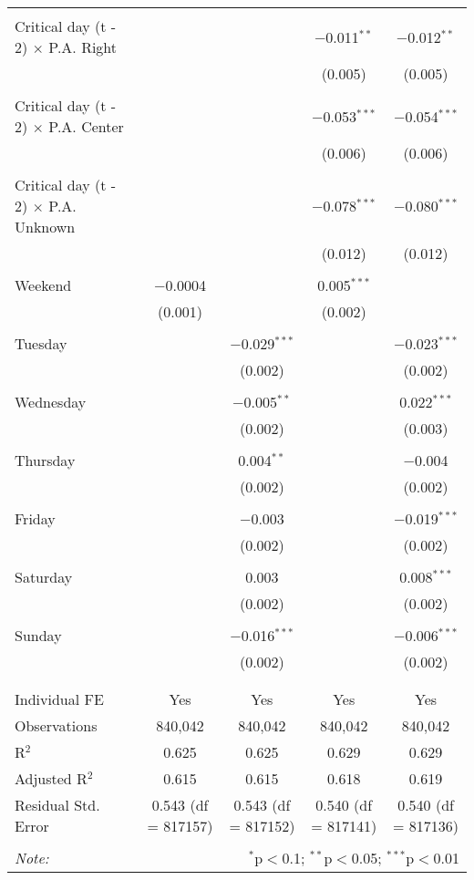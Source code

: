 \documentclass[
]{article}
\begin{document}
\begin{table}[!htbp]
{\begin{tabular}{@{\extracolsep{5pt}}lcccc}
  & & & & \\ 
 Critical day (t - 2) $\times$ P.A. Right &  &  & $-$0.011$^{**}$ & $-$0.012$^{**}$ \\ 
  &  &  & (0.005) & (0.005) \\ 
  & & & & \\ 
 Critical day (t - 2) $\times$ P.A. Center &  &  & $-$0.053$^{***}$ & $-$0.054$^{***}$ \\ 
  &  &  & (0.006) & (0.006) \\ 
  & & & & \\ 
 Critical day (t - 2) $\times$ P.A. Unknown &  &  & $-$0.078$^{***}$ & $-$0.080$^{***}$ \\ 
  &  &  & (0.012) & (0.012) \\ 
  & & & & \\ 
 Weekend & $-$0.0004 &  & 0.005$^{***}$ &  \\ 
  & (0.001) &  & (0.002) &  \\ 
  & & & & \\ 
 Tuesday &  & $-$0.029$^{***}$ &  & $-$0.023$^{***}$ \\ 
  &  & (0.002) &  & (0.002) \\ 
  & & & & \\ 
 Wednesday &  & $-$0.005$^{**}$ &  & 0.022$^{***}$ \\ 
  &  & (0.002) &  & (0.003) \\ 
  & & & & \\ 
 Thursday &  & 0.004$^{**}$ &  & $-$0.004 \\ 
  &  & (0.002) &  & (0.002) \\ 
  & & & & \\ 
 Friday &  & $-$0.003 &  & $-$0.019$^{***}$ \\ 
  &  & (0.002) &  & (0.002) \\ 
  & & & & \\ 
 Saturday &  & 0.003 &  & 0.008$^{***}$ \\ 
  &  & (0.002) &  & (0.002) \\ 
  & & & & \\ 
 Sunday &  & $-$0.016$^{***}$ &  & $-$0.006$^{***}$ \\ 
  &  & (0.002) &  & (0.002) \\ 
  & & & & \\ 
\hline \\[-1.8ex] 
Individual FE & Yes & Yes & Yes & Yes \\ 
Observations & 840,042 & 840,042 & 840,042 & 840,042 \\ 
R$^{2}$ & 0.625 & 0.625 & 0.629 & 0.629 \\ 
Adjusted R$^{2}$ & 0.615 & 0.615 & 0.618 & 0.619 \\ 
Residual Std. Error & 0.543 (df = 817157) & 0.543 (df = 817152) & 0.540 (df = 817141) & 0.540 (df = 817136) \\ 
\hline 
\hline \\[-1.8ex] 
\textit{Note:}  & \multicolumn{4}{r}{$^{*}$p$<$0.1; $^{**}$p$<$0.05; $^{***}$p$<$0.01} \\ 
\end{tabular}
} 
\end{table} 
\newpage
\end{document}
